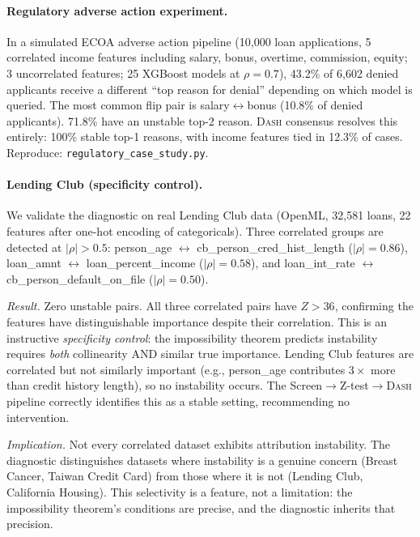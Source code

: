 \documentclass{article}
\newcommand{\DASH}{\textsc{Dash}}
\begin{document}
\paragraph{Regulatory adverse action experiment.}
\begin{sloppypar}
In a simulated ECOA adverse action pipeline (10{,}000 loan applications, 5 correlated
income features including salary, bonus, overtime, commission, equity; 3 uncorrelated
features; 25 XGBoost models at $\rho{=}0.7$), 43.2\% of 6{,}602 denied applicants
receive a different ``top reason for denial'' depending on which model is queried.
The most common flip pair is salary$\leftrightarrow$bonus (10.8\% of denied
applicants). 71.8\% have an unstable top-2 reason. \DASH{} consensus resolves this
entirely: 100\% stable top-1 reasons, with income features tied in 12.3\% of cases.
Reproduce: \texttt{regulatory\_case\_study.py}.
\end{sloppypar}

\paragraph{Lending Club (specificity control).}
We validate the diagnostic on real Lending Club data (OpenML,
32{,}581 loans, 22 features after one-hot encoding of categoricals).
Three correlated groups are detected at $|\rho| > 0.5$:
person\_age $\leftrightarrow$ cb\_person\_cred\_hist\_length
($|\rho| = 0.86$), loan\_amnt $\leftrightarrow$
loan\_percent\_income ($|\rho| = 0.58$), and loan\_int\_rate
$\leftrightarrow$ cb\_person\_default\_on\_file ($|\rho| = 0.50$).

\emph{Result.}
Zero unstable pairs. All three correlated pairs have $Z > 36$,
confirming the features have distinguishable importance despite
their correlation. This is an instructive \emph{specificity control}:
the impossibility theorem predicts instability requires \emph{both}
collinearity AND similar true importance. Lending Club features are
correlated but not similarly important (e.g., person\_age contributes
$3\times$ more than credit history length), so no instability occurs.
The Screen$\to$Z-test$\to$\DASH{} pipeline correctly identifies this as a
stable setting, recommending no intervention.

\emph{Implication.}
Not every correlated dataset exhibits attribution instability.
The diagnostic distinguishes datasets where instability is a genuine
concern (Breast Cancer, Taiwan Credit Card) from those where it is
not (Lending Club, California Housing). This selectivity is a
feature, not a limitation: the impossibility theorem's conditions are
precise, and the diagnostic inherits that precision.
\end{document}
